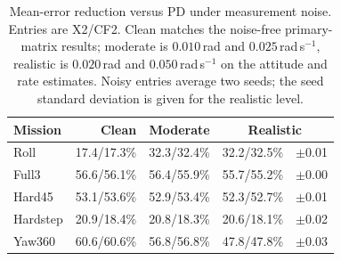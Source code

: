 \documentclass[letterpaper, 10 pt, conference]{ieeeconf}
\begin{document}


\begin{table}[ht]
\caption{Mean-error reduction versus PD under measurement noise. Entries are X2/CF2. Clean
matches the noise-free primary-matrix results; moderate is $0.010$\,rad and
$0.025$\,rad\,s$^{-1}$, realistic is $0.020$\,rad and $0.050$\,rad\,s$^{-1}$
on the attitude and rate estimates. Noisy entries average two seeds; the
seed standard deviation is given for the realistic level.}
\label{tab:noise}\centering\scriptsize
\setlength{\tabcolsep}{4pt}
\begin{tabular}{lrrr@{\,}l}
\toprule
Mission&Clean&Moderate&\multicolumn{2}{c}{Realistic}\\\midrule
Roll&17.4/17.3\%&32.3/32.4\%&32.2/32.5\%&$\pm$0.01\\
Full3&56.6/56.1\%&56.4/55.9\%&55.7/55.2\%&$\pm$0.00\\
Hard45&53.1/53.6\%&52.9/53.4\%&52.3/52.7\%&$\pm$0.01\\
Hardstep&20.9/18.4\%&20.8/18.3\%&20.6/18.1\%&$\pm$0.02\\
Yaw360&60.6/60.6\%&56.8/56.8\%&47.8/47.8\%&$\pm$0.03\\
\bottomrule
\end{tabular}
\end{table}
\end{document}
